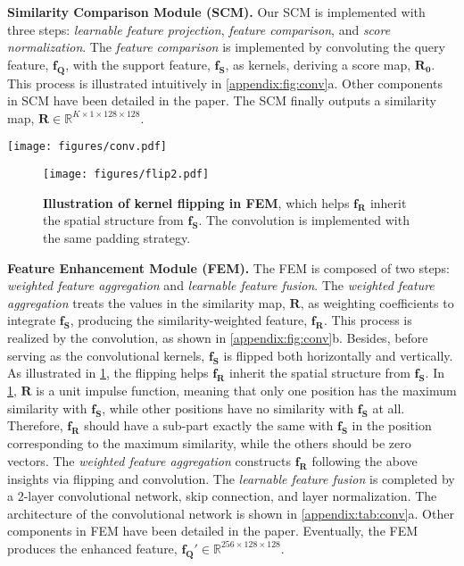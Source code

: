 \documentclass[10pt,twocolumn,letterpaper]{article}
\newcommand{\fs}{\bm{f_S}}
\newcommand{\fq}{\bm{f_Q}}
\newcommand{\Rraw}{\bm{R_0}}
\newcommand{\Rnorm}{\bm{R}}
\newcommand{\fweight}{\bm{f_R}}
\newcommand{\fout}{\bm{f_Q'}}
\begin{document}
\vspace{2pt}\noindent\textbf{Similarity Comparison Module (SCM).}
Our SCM is implemented with three steps: \textit{learnable feature projection}, \textit{feature comparison}, and \textit{score normalization}. 
The \textit{feature comparison} is implemented by convoluting the query feature, $\fq$, with the support feature, $\fs$, as kernels, deriving a score map, $\Rraw$. This process is illustrated intuitively in \cref{appendix:fig:conv}a. 
Other components in SCM have been detailed in the paper. 
The SCM finally outputs a similarity map, $\Rnorm \in \mathbb{R}^{K \times 1 \times 128 \times 128}$. 


\begin{figure*}[tb]
  \centering
  \texttt{[image: figures/conv.pdf]}
  \caption{\textbf{(a) Illustration of the \textit{feature comparison}} in SCM under the 1-shot case, where the feature projection is omitted. \textbf{(b) Illustration of the \textit{weighted feature aggregation}} in FEM under the 1-shot case.}
  \label{appendix:fig:conv}
\end{figure*}


\begin{figure}[tb]
\centering
\texttt{[image: figures/flip2.pdf]}
\caption{
    \textbf{Illustration of kernel flipping in FEM}, which helps $\fweight$ inherit the spatial structure from $\fs$. The convolution is implemented with the same padding strategy. 
}
\label{appendix:fig:flip}
\end{figure}


\vspace{2pt}\noindent\textbf{Feature Enhancement Module (FEM).} 
The FEM is composed of two steps: \textit{weighted feature aggregation} and \textit{learnable feature fusion}. 
The \textit{weighted feature aggregation} treats the values in the similarity map, $\Rnorm$, as weighting coefficients to integrate $\fs$, producing the similarity-weighted feature, $\fweight$. 
This process is realized by the convolution, as shown in \cref{appendix:fig:conv}b. 
Besides, before serving as the convolutional kernels, $\fs$ is flipped both horizontally and vertically. 
As illustrated in \cref{appendix:fig:flip}, the flipping helps $\fweight$ inherit the spatial structure from $\fs$. 
In \cref{appendix:fig:flip}, $\Rnorm$ is a unit impulse function, meaning that only one position has the maximum similarity with $\fs$, while other positions have no similarity with $\fs$ at all. 
Therefore, $\fweight$ should have a sub-part exactly the same with $\fs$ in the position corresponding to the maximum similarity, while the others should be zero vectors. 
The \textit{weighted feature aggregation} constructs $\fweight$ following the above insights via flipping and convolution. 
The \textit{learnable feature fusion} is completed by a 2-layer convolutional network, skip connection, and layer normalization. 
The architecture of the convolutional network is shown in \cref{appendix:tab:conv}a. 
Other components in FEM have been detailed in the paper. 
Eventually, the FEM produces the enhanced feature, $\fout \in \mathbb{R}^{256 \times 128 \times 128}$. 
\end{document}
